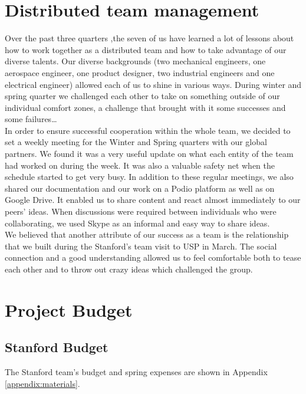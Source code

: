 \section{Distributed team management}

Over the past three quarters ,the seven of us have learned a lot of lessons about how to work together as a distributed team and how to take advantage of our diverse talents. Our diverse backgrounds (two mechanical engineers, one aerospace engineer, one product designer, two industrial engineers and one electrical engineer) allowed each of us to shine in various ways. During winter and spring quarter we challenged each other to take on something outside of our individual comfort zones, a challenge that brought with it some successes and some failures…\\

In order to ensure successful cooperation within the whole team, we decided to set a weekly meeting for the Winter and Spring quarters with our global partners. We found it was a very useful update on what each entity of the team had worked on during the week. It was also a valuable safety net when the schedule started to get very busy. In addition to these regular meetings, we also shared our documentation and our work on a Podio platform as well as on Google Drive. It enabled us to share content and react almost immediately to our peers’ ideas. When discussions were required between individuals who were collaborating, we used Skype as an informal and easy way to share ideas.\\

We believed that another attribute of our success as a team is the relationship that we built during the Stanford’s team visit to USP in March. The social connection and a good understanding allowed us to feel comfortable both to tease each other and to throw out crazy ideas which challenged the group.


\section{Project Budget}

\subsection{Stanford Budget}
The Stanford team's budget and spring expenses are shown in Appendix \ref{appendix:materials}.

